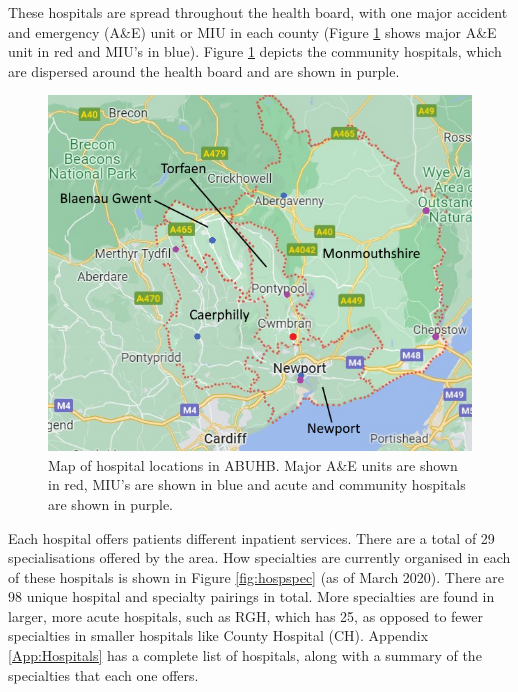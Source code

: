 \documentclass[../thesis.tex]{subfiles}
\begin{document}
These hospitals are spread throughout the health board, with one major accident and emergency (A\&E) unit or MIU in each county (Figure \ref{fig:abuhblocations1} shows major A\&E unit in red and MIU's in blue). Figure \ref{fig:abuhblocations1} depicts the community hospitals, which are dispersed around the health board and are shown in purple.

\begin{figure}[h!]
    \centering
    \includegraphics[scale=0.5]{Chapters/Chapter1/Figures/Updated_ABUHB2.png}
    \caption{Map of hospital locations in ABUHB. Major A\&E units are shown in red, MIU's are shown in blue and acute and community hospitals are shown in purple.}
    \label{fig:abuhblocations1}
\end{figure}

Each hospital offers patients different inpatient services. There are a total of 29 specialisations offered by the area. How specialties are currently organised in each of these hospitals is shown in Figure \ref{fig:hospspec} (as of March 2020). There are 98 unique hospital and specialty pairings in total. More specialties are found in larger, more acute hospitals, such as RGH, which has 25, as opposed to fewer specialties in smaller hospitals like County Hospital (CH). Appendix \ref{App:Hospitals} has a complete list of hospitals, along with a summary of the specialties that each one offers.
\end{document}
